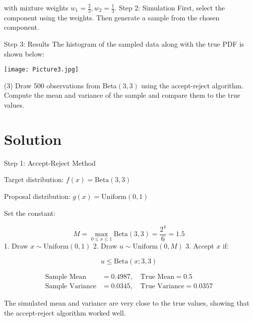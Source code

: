 \documentclass[final,11pt]{article}
\begin{document}
\begin{spacing}{1.25}
with mixture weights \( w_1 = \frac{2}{3}, w_2 = \frac{1}{3} \).
Step 2: Simulation
First, select the component using the weights.
Then generate a sample from the chosen component.

Step 3: Results
The histogram of the sampled data along with the true PDF is shown below:

\begin{center}
\texttt{[image: Picture3.jpg]}
\end{center}

\newpage

(3) Draw 500 observations from Beta$(3,3)$ using the accept-reject algorithm. Compute the mean and variance of the sample and compare them to the true values.

\section*{Solution}
Step 1: Accept-Reject Method

Target distribution: \( f(x) = \text{Beta}(3, 3) \)

Proposal distribution: \( g(x) = \text{Uniform}(0, 1) \)

Set the constant:

\[
M = \max_{0 \leq x \leq 1} \text{Beta}(3, 3) = \frac{2^4}{6} = 1.5
\]
1. Draw \( x \sim \text{Uniform}(0, 1) \)  
2. Draw \( u \sim \text{Uniform}(0, M) \)  
3. Accept \( x \) if:

\[
u \leq \text{Beta}(x; 3, 3)
\]

\[
\begin{aligned}
\text{Sample Mean} &= 0.4987, \quad \text{True Mean} = 0.5 \\
\text{Sample Variance} &= 0.0345, \quad \text{True Variance} = 0.0357
\end{aligned}
\]

The simulated mean and variance are very close to the true values, showing that the accept-reject algorithm worked well.

\end{spacing}
\end{document}
